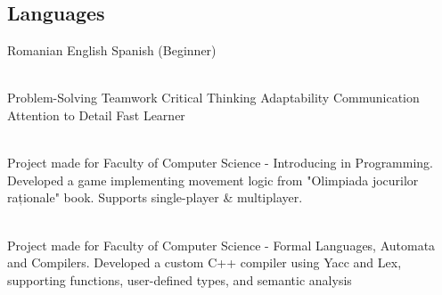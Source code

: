 \documentclass[a4paper]{MagicalCV}
\begin{document}
\begin{minipage}[t]{0.59\textwidth}
\subsection{Languages}
Romanian \textbullet{} English \textbullet{} Spanish (Beginner)
\sectionsep

 \\
Problem-Solving \textbullet{} Teamwork \textbullet{} Critical Thinking \textbullet{} Adaptability \textbullet{} Communication \textbullet{} Attention to Detail \textbullet{} Fast Learner
\sectionsep


 \\
Project made for Faculty of Computer Science - Introducing in Programming. Developed a game implementing movement logic from "Olimpiada jocurilor raționale" book. Supports single-player \& multiplayer.
\sectionsep

 \\
Project made for Faculty of Computer Science - Formal Languages, Automata and Compilers.
Developed a custom C++ compiler using Yacc and Lex, supporting functions, user-defined types, and semantic analysis
\sectionsep

\end{minipage} 
\end{document}
